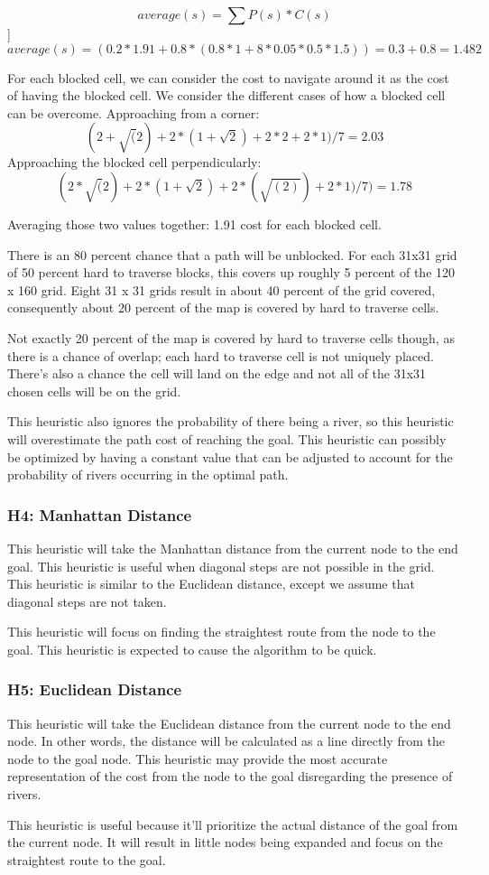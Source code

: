 \[average(s) = \sum{P(s)*C(s)}  \]]
\[average(s) = (0.2 * 1.91 + 0.8 * ( 0.8 * 1 + 8*0.05*0.5*1.5 ) ) = 0.3 + 0.8 = 1.482\]

For each blocked cell, we can consider the cost to navigate around it as the cost of having the blocked cell. We consider the different cases of how a blocked cell can be overcome. 
Approaching from a corner: \[(2 + \sqrt(2) + 2 * ( 1 + \sqrt{2}) + 2 * 2 + 2 * 1) / 7  = 2.03\]
Approaching the blocked cell perpendicularly: \[ (2*\sqrt(2) + 2*(1 + \sqrt{2}) + 2 * (\sqrt{(2)}) + 2*1 )/ 7 ) = 1.78 \]

Averaging those two values together: 1.91 cost for each blocked cell.

There is an 80 percent chance that a path will be unblocked.
For each 31x31 grid of 50 percent hard to traverse blocks, this covers up roughly 5 percent of the 120 x 160 grid. Eight 31 x 31 grids result in about 40 percent of the grid covered, consequently about 20 percent of the map is covered by hard to traverse cells.

Not exactly 20 percent of the map is covered by hard to traverse cells though, as there is a chance of overlap; each hard to traverse cell is not uniquely placed. There's also a chance the cell will land on the edge and not all of the 31x31 chosen cells will be on the grid.

This heuristic also ignores the probability of there being a river, so this heuristic will overestimate the path cost of reaching the goal. This heuristic can possibly be optimized by having a constant value that can be adjusted to account for the probability of rivers occurring in the optimal path.

\subsubsection{H4: Manhattan Distance}
This heuristic will take the Manhattan distance from the current node to the end goal. This heuristic is useful when diagonal steps are not possible in the grid. This heuristic is similar to the Euclidean distance, except we assume that diagonal steps are not taken.

This heuristic will focus on finding the straightest route from the node to the goal. This heuristic is expected to cause the algorithm to be quick.

\subsubsection{H5: Euclidean Distance}
This heuristic will take the Euclidean distance from the current node to the end node. In other words, the distance will be calculated as a line directly from the node to the goal node. This heuristic may provide the most accurate representation of the cost from the node to the goal disregarding the presence of rivers.

This heuristic is useful because it'll prioritize the actual distance of the goal from the current node. It will result in little nodes being expanded and focus on the straightest route to the goal.

